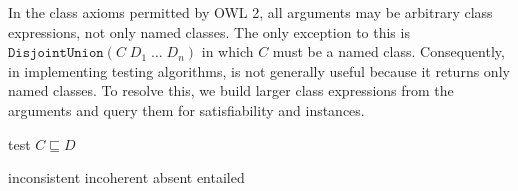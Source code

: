 \documentclass[paper.tex]{subfiles}
\begin{document}

In the class axioms permitted by OWL 2, all arguments may be arbitrary class expressions, not only named classes.  The only exception to this is $\mathtt{DisjointUnion}(C \; D_1 \; \ldots \; D_n)$ in which $C$ must be a named class.  Consequently, in implementing testing algorithms,  is not generally useful because it returns only named classes.  To resolve this, we build larger class expressions from the arguments and query them for satisfiability and instances.

\begin{algorithm}[H]
  \caption{test $C \sqsubseteq D$}
  \begin{algorithmic}[1]
    \raggedright
        \State \Return inconsistent
        \label{alg:testSubClassOf:returnInconsistent}
        \State \Return incoherent
        \label{alg:testSubClassOf:returnIncoherent}
        \State \Return absent
      \Else
        \State \Return entailed
        \label{alg:testSubClassOf:returnEntailed}
      \EndIf
    \EndFunction
  \end{algorithmic}
\end{algorithm}
\end{document}
